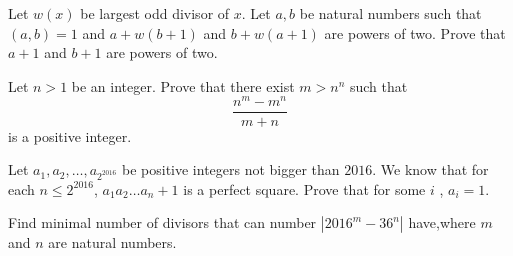 \documentclass[problems.tex]{subfile}
\begin{document}
	
	
	\begin{problem}
		Let $w(x)$ be largest odd divisor of $x$. Let $a,b$ be natural numbers such that $(a,b)=1$ and $a+w(b+1)$ and $b+w(a+1)$ are powers of two. Prove that $a+1$ and $b+1$ are powers of two. %
	\end{problem}
	
	
	
	\begin{problem}
		Let $n>1$ be an integer. Prove that there exist $m>n^n $ such that $$\frac {n^m-m^n}{m+n}$$ is a positive integer. %
	\end{problem}
	
	
	
	
	\begin{problem}
		Let $a_1, a_2, \dots, a_{2^{2016}}$ be positive integers not bigger than $2016$. We know that for each $n \leq 2^{2016}$, $a_1a_2 \dots a_{n} +1 $ is a perfect square. Prove that for some $i $ , $a_i=1$. %
	\end{problem}
	
	
	\begin{problem}
		Find minimal number of divisors that can number $|2016^m-36^n|$ have,where $m$ and $n$ are natural numbers. %
	\end{problem}
	
	
\end{document}
